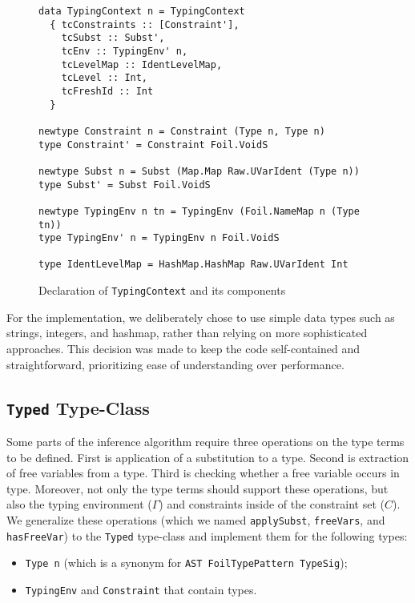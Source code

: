 \begin{figure}[H]
\begin{verbatim}
data TypingContext n = TypingContext
  { tcConstraints :: [Constraint'],
    tcSubst :: Subst',
    tcEnv :: TypingEnv' n,
    tcLevelMap :: IdentLevelMap,
    tcLevel :: Int,
    tcFreshId :: Int
  }

newtype Constraint n = Constraint (Type n, Type n)
type Constraint' = Constraint Foil.VoidS

newtype Subst n = Subst (Map.Map Raw.UVarIdent (Type n))
type Subst' = Subst Foil.VoidS

newtype TypingEnv n tn = TypingEnv (Foil.NameMap n (Type tn))
type TypingEnv' n = TypingEnv n Foil.VoidS

type IdentLevelMap = HashMap.HashMap Raw.UVarIdent Int
\end{verbatim}
  \caption[\texttt{TypingContext} and its components]{Declaration of \texttt{TypingContext} and its components}
  \label{fig:impl-typing-context}
\end{figure}

For the implementation, we deliberately chose to use simple data types such as strings, integers, and hashmap, rather than relying on more sophisticated approaches. This decision was made to keep the code self-contained and straightforward, prioritizing ease of understanding over performance.

\subsection{\texttt{Typed} Type-Class}

Some parts of the inference algorithm require three operations on the type terms to be defined. First is application of a substitution to a type. Second is extraction of free variables from a type. Third is checking whether a free variable occurs in type. Moreover, not only the type terms should support these operations, but also the typing environment ($\Gamma$) and constraints inside of the constraint set ($C$). We generalize these operations (which we named \texttt{applySubst}, \texttt{freeVars}, and \texttt{hasFreeVar}) to the \texttt{Typed} type-class and implement them for the following types:

\begin{itemize}
  \item \texttt{Type n} (which is a synonym for \texttt{AST FoilTypePattern TypeSig});
  \item \texttt{TypingEnv} and \texttt{Constraint} that contain types.
\end{itemize}

